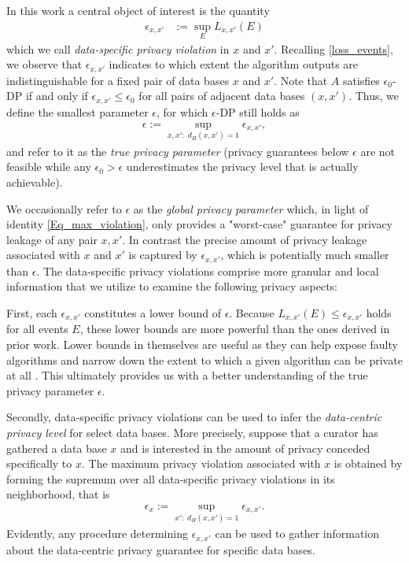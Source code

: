 \documentclass[conference]{IEEEtran}
\begin{document}
In this work a central object of interest is the quantity
\begin{align} 
\epsilon_{x,x'} & := \sup_E L_{x,x'}(E)
\label{lower_bound}
\end{align}
which we call \textit{data-specific privacy violation} in $x$ and $x'$. Recalling \eqref{loss_events}, we observe that $\epsilon_{x,x'}$ indicates to which extent  the algorithm outputs are indistinguishable  for a fixed pair of data bases $x$ and $x'$. Note that $A$ satisfies $\epsilon_0$-DP if and only if $\epsilon_{x,x'} \le \epsilon_0$ for all pairs of adjacent data bases $(x,x')$. Thus, we define the smallest parameter $\epsilon$, for which $\epsilon$-DP still holds as
\begin{align} \label{Eq_max_violation}
\epsilon := \sup\limits_{x,x': \; d_H(x,x') = 1} \epsilon_{x,x'},
\end{align}
and refer to it as the \textit{true privacy parameter} (privacy guarantees below $\epsilon$ are not feasible while any $\epsilon_0 > \epsilon$ underestimates the privacy level that is actually achievable). 

We occasionally refer to $\epsilon$ as the \textit{global privacy parameter} which, in light of  identity  \eqref{Eq_max_violation}, only provides a "worst-case" guarantee for privacy leakage of any pair $x,x'$. In contrast the precise amount of privacy leakage associated with $x$ and $x'$ is captured by $\epsilon_{x,x'}$, which is potentially much smaller than $\epsilon$. The data-specific privacy violations comprise more granular and local information that we utilize to examine the following privacy aspects:


First, each $\epsilon_{x,x'}$ constitutes a lower bound of $\epsilon$. Because $L_{x,x'}(E) \leq \epsilon_{x,x'}$ holds for all events $E$, these lower bounds are more powerful than the ones derived in prior work. Lower bounds in themselves are useful as they can help expose faulty algorithms \cite{DP-Finder} and narrow down the extent to which a given algorithm can be private at all \cite{DP-Sniper}. This ultimately provides us with a better understanding of the true privacy parameter $\epsilon$.


Secondly, data-specific privacy violations can be used to infer the \textit{data-centric privacy level} for select data bases. More precisely, suppose that a curator has gathered a data base $x$ and is interested in the amount of privacy conceded specifically to $x$. The maximum privacy violation associated with $x$ is obtained by forming the supremum over all data-specific privacy violations in its neighborhood, that is
\begin{align}
    \label{Eq_def_epsx}
\epsilon_x := \sup\limits_{x': \; d_H(x,x') = 1} \epsilon_{x,x'}.
\end{align}
Evidently, any procedure determining $\epsilon_{x,x'}$ can be used to gather information about the data-centric privacy guarantee for specific data bases.
\end{document}
